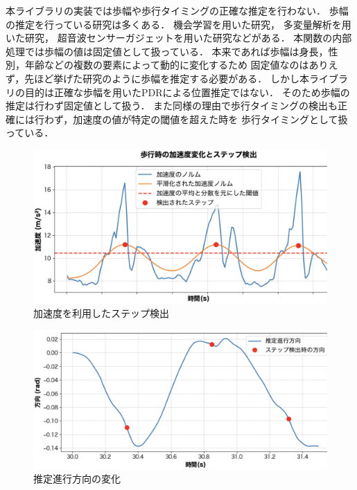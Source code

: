 本ライブラリの実装では歩幅や歩行タイミングの正確な推定を行わない．
歩幅の推定を行っている研究は多くある．
機会学習を用いた研究\cite{stride-length-auto-learning}，
多変量解析を用いた研究\cite{stride-length-multi}，
超音波センサーガジェットを用いた研究\cite{stride-length-ultrasonic}などがある．
本関数の内部処理では歩幅の値は固定値として扱っている．
本来であれば歩幅は身長，性別，年齢などの複数の要素によって動的に変化するため
固定値なのはありえず，先ほど挙げた研究のように歩幅を推定する必要がある．
しかし本ライブラリの目的は正確な歩幅を用いたPDRによる位置推定ではない．
そのため歩幅の推定は行わず固定値として扱う．
また同様の理由で歩行タイミングの検出も正確には行わず，加速度の値が特定の閾値を超えた時を
歩行タイミングとして扱っている．

\begin{figure}[ht]
	\centering
	\includegraphics[width=\linewidth]{image/step_detect.jpg}
	\caption{加速度を利用したステップ検出}    \label{fig:step_detect}
\end{figure}


\begin{figure}[ht]
	\centering
	\includegraphics[width=\linewidth]{image/step_timing_angle.jpg}
	\caption{推定進行方向の変化}    \label{fig:step_timing}
\end{figure}


